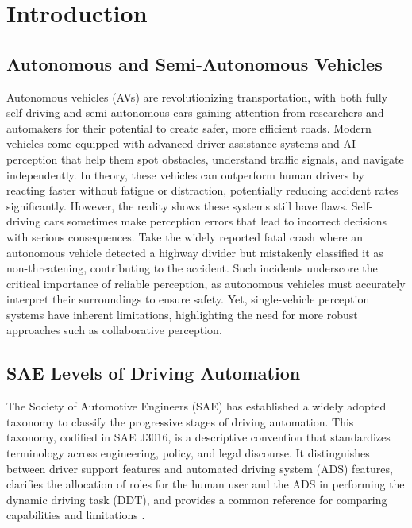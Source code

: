 \chapter{Introduction}
\label{introduction}

\section{Autonomous and Semi-Autonomous Vehicles}
Autonomous vehicles (AVs) are revolutionizing transportation, with both fully self-driving and semi-autonomous cars gaining attention from researchers and automakers for their potential to create safer, more efficient roads.
Modern vehicles come equipped with advanced driver-assistance systems and AI perception that help them spot obstacles, understand traffic signals, and navigate independently.
In theory, these vehicles can outperform human drivers by reacting faster without fatigue or distraction, potentially reducing accident rates significantly.
However, the reality shows these systems still have flaws. Self-driving cars sometimes make perception errors that lead to incorrect decisions with serious consequences.
Take the widely reported fatal crash where an autonomous vehicle detected a highway divider but mistakenly classified it as non-threatening, contributing to the accident.
Such incidents underscore the critical importance of reliable perception, as autonomous vehicles must accurately interpret their surroundings to ensure safety.
Yet, single-vehicle perception systems have inherent limitations, highlighting the need for more robust approaches such as collaborative perception.

\section{SAE Levels of Driving Automation}

The Society of Automotive Engineers (SAE) has established a widely adopted taxonomy to classify the progressive stages of driving automation. This taxonomy, codified in SAE J3016, is a descriptive convention that standardizes terminology across engineering, policy, and legal discourse. It distinguishes between driver support features and automated driving system (ADS) features, clarifies the allocation of roles for the human user and the ADS in performing the dynamic driving task (DDT), and provides a common reference for comparing capabilities and limitations \cite{SAEJ3016_2021}.

